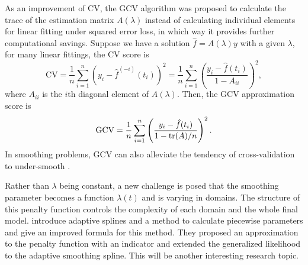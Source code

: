 As an improvement of CV, the GCV algorithm was proposed to calculate the trace of the estimation matrix $A(\lambda)$ instead of calculating individual elements for linear fitting under squared error loss, in which way it provides further computational savings. Suppose we have a solution $\hat{f}=A(\lambda)y$ with a given $\lambda$, for many linear fittings, the CV score is 
\begin{equation}
\mbox{CV} = \frac{1}{n}\sum_{i=1}^{n} \left( y_i - \hat{f}^{(-i)}(t_i)\right)^2 = \frac{1}{n} \sum_{i=1}^{n}\left( \frac{y_i-\hat{f}(t_i)}{1-A_{ii}}  \right)^2, 
\end{equation}
where $A_{ii}$ is the $i$th diagonal element of $A(\lambda)$. Then, the GCV approximation score is 
\begin{equation}
\mbox{GCV} =\frac{1}{n} \sum_{i=1}^{n}\left( \frac{y_i-\hat{f}(t_i)}{1-\mathrm{tr}(A)/n}  \right)^2.
\end{equation}
In smoothing problems, GCV can also alleviate the tendency of cross-validation to under-smooth \citep{esl2009}. 


Rather than $\lambda$ being constant, a new challenge is posed that the smoothing parameter becomes a function $\lambda(t)$ and is varying in domains. The structure of this penalty function controls the complexity of each domain and the whole final model.  \cite{donoho1995wavelet} introduce adaptive splines and a method to calculate piecewise parameters and \cite{liu2010data} give an improved formula for this method. They proposed an approximation to the penalty function with an indicator and extended the generalized likelihood to the adaptive smoothing spline. This will be another interesting research topic. 






